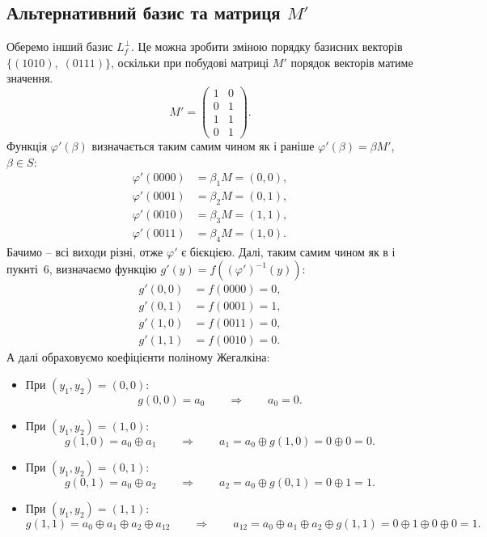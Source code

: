 \subsection{Альтернативний базис та матриця \texorpdfstring{$M'$}{MatrixM}}
Оберемо інший базис $L_{f}^{\perp}$. Це можна зробити зміною порядку базисних векторів $\{(1010),\; (0111)\}$, 
оскільки при побудові матриці $M'$ порядок векторів матиме значення.
\begin{equation*}
    M' = \begin{pmatrix}
        1 & 0 \\
        0 & 1 \\
        1 & 1 \\
        0 & 1
    \end{pmatrix}.
\end{equation*}
Функція $\varphi'(\beta)$ визначається таким самим чином як і раніше $\varphi'(\beta) = \beta M'$, $\beta \in S$:
\begin{align*}
    \varphi'(0000) & = \beta_{1} M = (0, 0), \\
    \varphi'(0001) & = \beta_{2} M = (0, 1), \\
    \varphi'(0010) & = \beta_{3} M = (1, 1), \\
    \varphi'(0011) & = \beta_{4} M = (1, 0).
\end{align*}
Бачимо -- всі виходи різні, отже $\varphi'$ є бієкцією. Далі, таким самим чином як в і пукнті~6, визначаємо функцію 
$g'(y) = f((\varphi')^{-1}(y))$:
\begin{align*}
    g'(0,0) & = f(0000) = 0, \\
    g'(0,1) & = f(0001) = 1, \\
    g'(1,0) & = f(0011) = 0, \\
    g'(1,1) & = f(0010) = 0.
\end{align*}
А далі обраховуємо коефіцієнти поліному Жегалкіна:
\begin{itemize}
    \item При $(y_1, y_2) = (0,0)$:
        \begin{equation*}
            g(0,0) = a_0 \qquad\Longrightarrow\qquad a_0 = 0.
        \end{equation*}
    \item При $(y_1, y_2) = (1,0)$:
        \begin{equation*}
            g(1,0) = a_0 \oplus a_1 \qquad\Longrightarrow\qquad a_1 = a_0 \oplus g(1,0) = 0 \oplus 0 = 0.
        \end{equation*}
    \item При $(y_1, y_2) = (0,1)$:
        \begin{equation*}
            g(0,1) = a_0 \oplus a_2 \qquad\Longrightarrow\qquad a_2 = a_0 \oplus g(0,1) = 0 \oplus 1 = 1.
        \end{equation*}
    \item При $(y_1, y_2) = (1,1)$:
        \begin{equation*}
            g(1,1) = a_0 \oplus a_1 \oplus a_2 \oplus a_{12} \qquad\Longrightarrow\qquad
            a_{12} = a_0 \oplus a_1 \oplus a_2 \oplus g(1,1) = 0 \oplus 1 \oplus 0 \oplus 0 = 1.
        \end{equation*}
\end{itemize}
